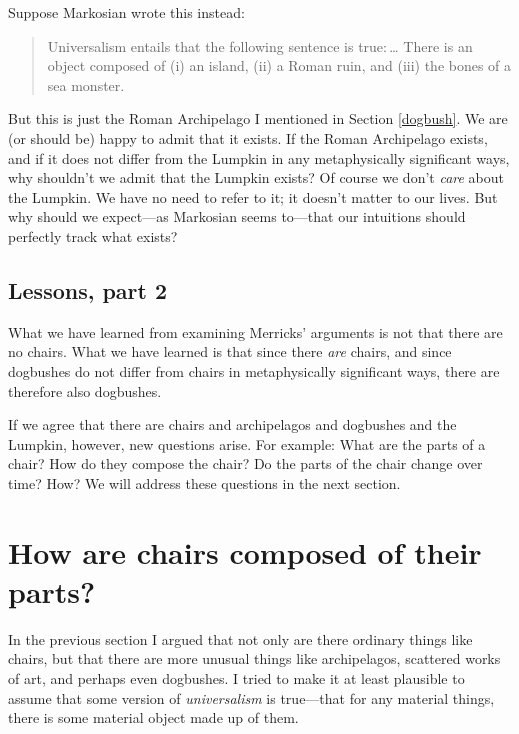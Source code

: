 \documentclass[12pt,twoside]{reedfancy}
\begin{document}
\begin{spacing}{1.25}
Suppose Markosian wrote this instead:

\begin{quote}
Universalism entails that the following sentence is true:\,\ldots
There is an object composed of (i) an island, (ii) a Roman ruin, and
(iii) the bones of a sea monster.
\end{quote}

But this is just the Roman Archipelago I mentioned in Section
\ref{dogbush}.  We are (or should be) happy to admit that it exists.
If the Roman Archipelago exists, and if it does not differ from the
Lumpkin in any metaphysically significant ways, why shouldn't we admit
that the Lumpkin exists?  Of course we don't {\em care} about the
Lumpkin.  We have no need to refer to it; it doesn't matter to our
lives.  But why should we expect---as Markosian seems to---that our
intuitions should perfectly track what exists?

\section{Lessons, part 2}
\label{lessons-m}
What we have learned from examining Merricks' arguments is not that
there are no chairs.  What we have learned is that since there {\em
  are} chairs, and since dogbushes do not differ from chairs in
metaphysically significant ways, there are therefore also dogbushes.

If we agree that there are chairs and archipelagos and dogbushes and
the Lumpkin, however, new questions arise. For example: What are the
parts of a chair?  How do they compose the chair?  Do the parts of the
chair change over time?  How?  We will address these questions in the
next section.  


\chapter{How are chairs composed of their parts?}
\label{parts}

In the previous section I argued that not only are there ordinary
things like chairs, but that there are more unusual things like
archipelagos, scattered works of art, and perhaps even dogbushes.  I
tried to make it at least plausible to assume that some version of
{\em universalism} is true---that for any material things, there is
some material object made up of them.


\end{spacing}
\end{document}
